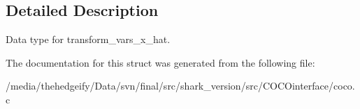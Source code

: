 \subsection{Detailed Description}
Data type for transform\+\_\+vars\+\_\+x\+\_\+hat. 

The documentation for this struct was generated from the following file\+:\begin{DoxyCompactItemize}
\item 
/media/thehedgeify/\+Data/svn/final/src/shark\+\_\+version/src/\+C\+O\+C\+Ointerface/coco.\+c\end{DoxyCompactItemize}
